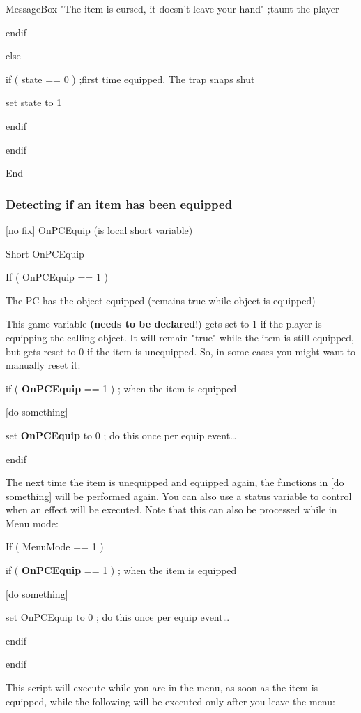 \documentclass[
]{article}
\begin{document}
MessageBox "The item is cursed, it doesn't leave your hand" ;taunt the
player

endif

else

if ( state == 0 ) ;first time equipped. The trap snaps shut

set state to 1

endif

endif

End

\hypertarget{detecting-if-an-item-has-been-equipped}{%
\subsubsection{Detecting if an item has been
equipped}\label{detecting-if-an-item-has-been-equipped}}

{[}no fix{]} OnPCEquip (is local short variable)

Short OnPCEquip

If ( OnPCEquip == 1 )

The PC has the object equipped (remains true while object is equipped)

This game variable \textbf{(needs to be declared}!) gets set to 1 if the
player is equipping the calling object. It will remain "true" while the
item is still equipped, but gets reset to 0 if the item is unequipped.
So, in some cases you might want to manually reset it:

if ( \textbf{OnPCEquip} == 1 ) ; when the item is equipped

{[}do something{]}

set \textbf{OnPCEquip} to 0 ; do this once per equip event\ldots{}

endif

The next time the item is unequipped and equipped again, the functions
in {[}do something{]} will be performed again. You can also use a status
variable to control when an effect will be executed. Note that this can
also be processed while in Menu mode:

If ( MenuMode == 1 )

if ( \textbf{OnPCEquip} == 1 ) ; when the item is equipped

{[}do something{]}

set OnPCEquip to 0 ; do this once per equip event\ldots{}

endif

endif

This script will execute while you are in the menu, as soon as the item
is equipped, while the following will be executed only after you leave
the menu:
\end{document}
